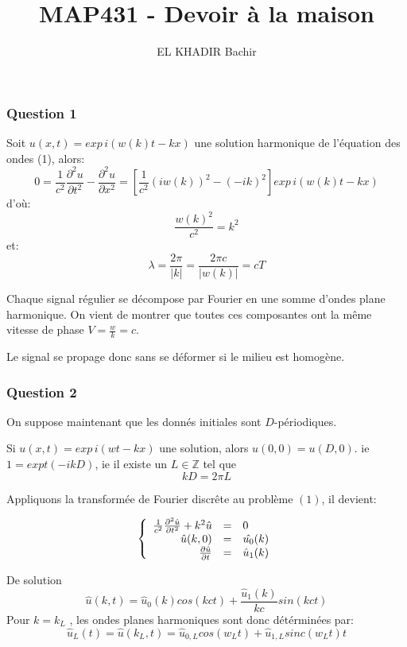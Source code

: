 \documentclass{article}
\newcommand{\Q}[1]{\subsubsection*{Question #1}}
\begin{document}
\title{MAP431 - Devoir à la maison}
\author{EL KHADIR Bachir}


\maketitle

\Q{1} 
Soit $u(x,t) = exp\,i(w(k)t-kx)$ une solution harmonique de l'équation des ondes (1), alors:
$$ 0 = \frac{1}{c^2} \frac{\partial^2{u}}{\partial{t^2}} - \frac{\partial^2{u}}{\partial{x^2}} 
= [\frac{1}{c^2} (iw(k))^2 - (-ik)^2 ]exp\,i(w(k)t-kx)$$
d'où: $$\frac{w(k)^2}{c^2}= k^2$$
et:
$$ \lambda = \frac{2\pi}{|k|} = \frac{2 \pi c}{|w(k)|} = c T $$

Chaque signal régulier se décompose par Fourier en une somme d'ondes plane harmonique. 
On vient de montrer que toutes ces composantes ont la même vitesse de phase 
$ V = \frac{w}{k} = c$.

Le signal se propage donc sans se déformer si le milieu est homogène.

\Q{2}

On suppose maintenant que les donnés initiales sont $D$-périodiques.

Si $u(x,t) = exp\,i(wt-kx)$ une solution, alors $u(0,0)=u(D,0)$.
ie $1 = expt(-ikD)$, 
ie il existe un $L \in \mathbb{Z}$ tel que $$kD = 2\pi L$$

Appliquons la transformée de Fourier discrête au problème $(1)$, il devient:

\[
\left\{
\begin{array}{r c l}
\frac{1}{c^2} \frac{\partial^2 \hat{u} }{\partial t^2} + k^2 \hat{u} & = &0 \\
\hat{u}(k, 0) & = & \hat{u_0}(k) \\
\frac{ \partial \hat{u} }{\partial t} & = & \hat{u}_1(k)
\end{array}
\right.
\]

De solution 
$$ \hat{u}(k, t) =  \hat{u}_0(k) cos(kc t) + \frac{\hat{u}_1(k)}{kc} sin(kc t)  $$
Pour $k = k_L$ , les ondes planes harmoniques sont donc détérminées par:
$$ \hat{u}_L(t) = \hat{u}(k_L,t)  = \hat{u}_{0, L} cos(w_L t) + \hat{u}_{1, L} sinc(w_L t) t$$
\end{document}
